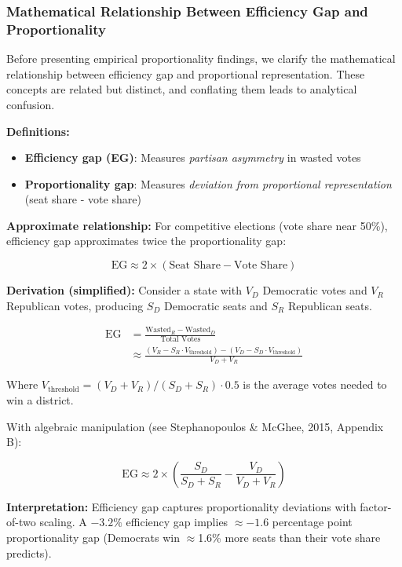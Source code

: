 \subsubsection{Mathematical Relationship Between Efficiency Gap and Proportionality}
\label{sec:eg-proportionality-connection}

Before presenting empirical proportionality findings, we clarify the mathematical relationship between efficiency gap and proportional representation. These concepts are related but distinct, and conflating them leads to analytical confusion.

\textbf{Definitions:}
\begin{itemize}
    \item \textbf{Efficiency gap (EG)}: Measures \emph{partisan asymmetry} in wasted votes
    \item \textbf{Proportionality gap}: Measures \emph{deviation from proportional representation} (seat share - vote share)
\end{itemize}

\textbf{Approximate relationship:}
For competitive elections (vote share near 50\%), efficiency gap approximates twice the proportionality gap:

\begin{equation}
\text{EG} \approx 2 \times (\text{Seat Share} - \text{Vote Share})
\end{equation}

\textbf{Derivation (simplified):}
Consider a state with $V_D$ Democratic votes and $V_R$ Republican votes, producing $S_D$ Democratic seats and $S_R$ Republican seats.

\begin{align*}
\text{EG} &= \frac{\text{Wasted}_R - \text{Wasted}_D}{\text{Total Votes}} \\
&\approx \frac{(V_R - S_R \cdot V_{\text{threshold}}) - (V_D - S_D \cdot V_{\text{threshold}})}{V_D + V_R}
\end{align*}

Where $V_{\text{threshold}} = (V_D + V_R) / (S_D + S_R) \cdot 0.5$ is the average votes needed to win a district.

With algebraic manipulation (see Stephanopoulos \& McGhee, 2015, Appendix B):

\begin{equation}
\text{EG} \approx 2 \times \left(\frac{S_D}{S_D + S_R} - \frac{V_D}{V_D + V_R}\right)
\end{equation}

\textbf{Interpretation:} Efficiency gap captures proportionality deviations with factor-of-two scaling. A $-3.2\%$ efficiency gap implies $\approx -1.6$ percentage point proportionality gap (Democrats win $\approx$1.6\% more seats than their vote share predicts).

